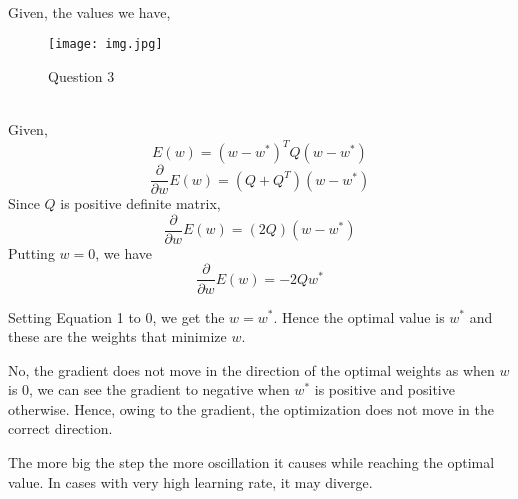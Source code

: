\documentclass[letterpaper]{article}
\begin{document}
\\
	
	Given, the values we have,
	
	 \begin{figure} [H]
		\centering
		\texttt{[image: img.jpg]}
		\caption{\label{fig:data}Question 3}
	\end{figure}

\\
	
	\noindent Given, 
	\[
		E(w) = (w - w^{\ast})^TQ(w-w^{\ast})
	\]
	\[
		\frac{\partial}{\partial w} E(w) = (Q + Q^T)(w-w^{\ast})
	\]
	Since \(Q\) is positive definite matrix,
	\[
		\frac{\partial}{\partial w} E(w) = (2Q)(w-w^{\ast})
		\tag{1}
	\]
	Putting \(w = 0\), we have 
	\[
		\frac{\partial}{\partial w} E(w) = -2Qw^{\ast}
	\]
	
	Setting Equation 1 to 0, we get the \(w = w^{*}\). Hence the optimal value is \(w^{*}\) and these are the weights that minimize \(w\).
	
	No, the gradient does not move in the direction of the optimal weights as when \(w\) is 0, we can see the gradient to negative when \(w^{\ast}\) is positive and positive otherwise. Hence, owing to the gradient, the optimization does not move in the correct direction.
	
	The more big the step the more oscillation it causes while reaching the optimal value. In cases with very high learning rate, it may diverge.
	
	
	
\end{document}
